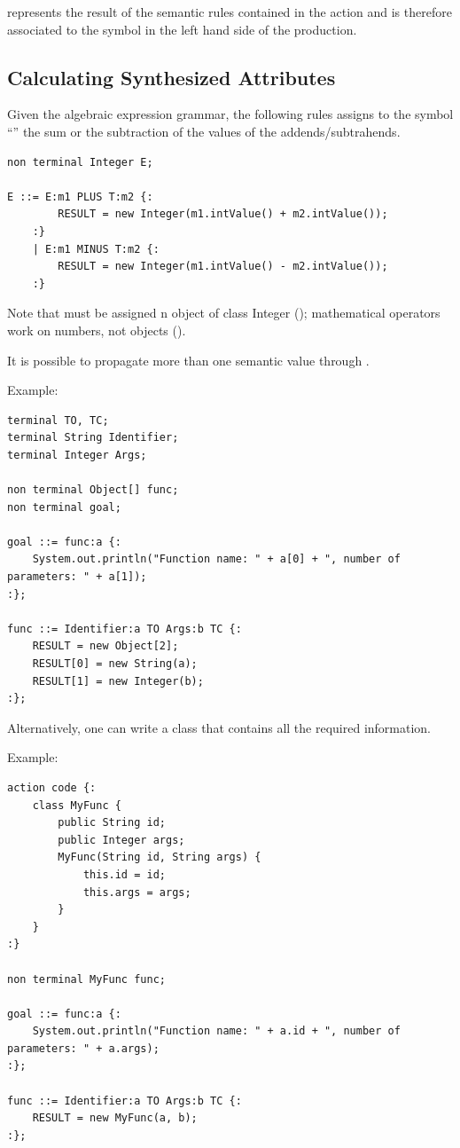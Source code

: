  represents the result of the semantic rules contained in the action and is therefore associated to the symbol in the left hand side of the production.

\subsection{Calculating Synthesized Attributes}
Given the algebraic expression grammar, the following rules assigns to the symbol ``'' the sum or the subtraction of the values of the addends/subtrahends.
\begin{lstlisting}[frame=single]
non terminal Integer E;

E ::= E:m1 PLUS T:m2 {:
        RESULT = new Integer(m1.intValue() + m2.intValue());
    :}
    | E:m1 MINUS T:m2 {:
        RESULT = new Integer(m1.intValue() - m2.intValue());
    :}
\end{lstlisting}
Note that  must be assigned n object of class Integer (); mathematical operators work on numbers, not objects ().

It is possible to propagate more than one semantic value through .

Example:
\begin{lstlisting}[frame=single]
terminal TO, TC;
terminal String Identifier;
terminal Integer Args;

non terminal Object[] func;
non terminal goal;

goal ::= func:a {:
    System.out.println("Function name: " + a[0] + ", number of parameters: " + a[1]);
:};

func ::= Identifier:a TO Args:b TC {:
    RESULT = new Object[2];
    RESULT[0] = new String(a);
    RESULT[1] = new Integer(b);
:};
\end{lstlisting}
Alternatively, one can write a class that contains all the required information.

Example:
\begin{lstlisting}[frame=single]
action code {:
    class MyFunc {
        public String id;
        public Integer args;
        MyFunc(String id, String args) {
            this.id = id;
            this.args = args;
        }
    }
:}

non terminal MyFunc func;

goal ::= func:a {:
    System.out.println("Function name: " + a.id + ", number of parameters: " + a.args);
:};

func ::= Identifier:a TO Args:b TC {:
    RESULT = new MyFunc(a, b);
:};
\end{lstlisting}

